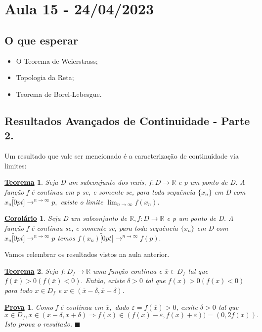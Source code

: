 \documentclass{article}
\newtheorem*{theorem*}{\underline{Teorema}}
\newtheorem*{proof*}{\underline{Prova}}
\newtheorem*{crl*}{\underline{Corol\'ario}}
\renewcommand\qedsymbol{$\blacksquare$}
\begin{document}
\section{Aula 15 - 24/04/2023}
\subsection{O que esperar}
\begin{itemize}
  \item O Teorema de Weierstrass;
  \item Topologia da Reta;
  \item Teorema de Borel-Lebesgue.
\end{itemize}
\subsection{Resultados Avan\c cados de Continuidade - Parte 2.}
  Um resultado que vale ser mencionado \'e a caracteriza\c c\~ao de continuidade via limites:
 \begin{theorem*}
   Seja D um subconjunto dos reais, $f:D\rightarrow \mathbb{R}$ e p um ponto de D. A fun\c c\~ao f \'e cont\'inua em p se, e somente
   se, para toda sequ\^encia $\{x_{n}\}$ em D com $x_{n}\overbracket[0pt]{\longrightarrow}^{n\to \infty}p,$ existe o limite $\lim_{n\to \infty}f(x_{n}).$
 \end{theorem*}
\begin{crl*}
  Seja D um subconjunto de $\mathbb{R}, f:D\rightarrow \mathbb{R} $ e p um ponto de D. A fun\c c\~ao f \'e cont\'inua se, e somente
  se, para toda sequ\^encia $\{x_{n}\}$ em D com $x_{n}\overbracket[0pt]{\longrightarrow}^{n\to \infty}p$ temos $f(x_{n})\overbracket[0pt]{\longrightarrow}^{n\to \infty}f(p).$
\end{crl*}
Vamos relembrar os resultados vistos na aula anterior.
 \begin{theorem*}
   Seja $f:D_{f}\rightarrow \mathbb{R}$ uma fun\c c\~ao cont\'inua e $\overline{x}\in D_{f}$ tal que $f(\overline{x})>0(f(\overline{x})<0).$ 
   Ent\~ao, existe $\delta>0$ tal que $f(x)>0(f(x)<0)$ para todo $x\in D_{f}$ e $x\in(\overline{x}-\delta, \overline{x}+\delta).$
 \end{theorem*}
 \begin{proof*}
   Como f \'e cont\'inua em $\overline{x},$ dado $\varepsilon = f(\overline{x}) >0$, exsite $\delta > 0$ tal que 
     $$
       x\in D_{f}, x\in(\overline{x}-\delta, \overline{x}+\delta) \Rightarrow f(x)\in (f(\overline{x})-\varepsilon, f(\overline{x})+\varepsilon)) =
  (0, 2f(\overline{x})).
     $$
     Isto prova o resultado. \qedsymbol
 \end{proof*}
\end{document}
